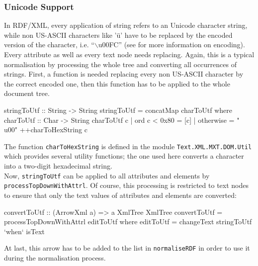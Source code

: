 \documentclass[11pt,a4paper,headsepline, bibtotoc]{scrreprt}
\begin{document}
\subsubsection{Unicode Support}
In RDF/XML, every application of string refers to an Unicode character string, while non US-ASCII characters like '\"u' have to be replaced by the encoded version of the character, i.e. ``$\backslash$u00FC'' (see \cite{CHARMOD} for more information on encoding). Every attribute as well as every text node needs replacing. Again, this is a typical normalisation by processing the whole tree and converting all occurrences of strings. First, a function is needed replacing every non US-ASCII character by the correct encoded one, then this function has to be applied to the whole document tree.
\begin{code}
stringToUtf :: String -> String
stringToUtf = concatMap charToUtf
    where
    charToUtf :: Char -> String
    charToUtf c
        | ord c < 0x80  = [c]
        | otherwise = "\\u00" ++charToHexString c
\end{code}
The function \texttt{charToHexString} is defined in the module \texttt{Text.XML.MXT.DOM.Util} which provides several utility functions; the one used here converts a character into a two-digit hexadecimal string.\\
Now, \texttt{stringToUtf} can be applied to all attributes and elements by \texttt{process\-TopDown\-WithAttrl}. Of course, this processing is restricted to text nodes to ensure that only the text values of attributes and elements are converted:
\clearpage
\begin{code}
convertToUtf :: (ArrowXml a) => a XmlTree XmlTree
convertToUtf
        = processTopDownWithAttrl editToUtf
            where 
            editToUtf = changeText stringToUtf `when` isText
\end{code}
At last, this arrow has to be added to the list in \texttt{normaliseRDF} in order to use it during the normalisation process.
\end{document}
